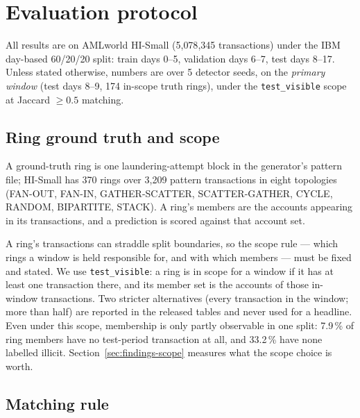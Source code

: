 \section{Evaluation protocol}
\label{sec:data}

All results are on AMLworld HI-Small (5{,}078{,}345 transactions) under the IBM day-based
60/20/20 split: train days 0--5, validation days 6--7, test days 8--17.
Unless stated otherwise, numbers are over 5 detector seeds, on the \emph{primary window}
(test days 8--9, 174 in-scope truth rings), under the \texttt{test\_visible} scope at
Jaccard $\ge 0.5$ matching.

\subsection{Ring ground truth and scope}
\label{sec:data-scope}

A ground-truth ring is one laundering-attempt block in the generator's pattern file; HI-Small
has 370 rings over 3{,}209 pattern transactions in eight topologies (FAN-OUT, FAN-IN,
GATHER-SCATTER, SCATTER-GATHER, CYCLE, RANDOM, BIPARTITE, STACK).
A ring's members are the accounts appearing in its transactions, and a prediction is scored
against that account set.

A ring's transactions can straddle split boundaries, so the scope rule --- which rings a
window is held responsible for, and with which members --- must be fixed and stated. We use
\texttt{test\_visible}: a ring is in scope for a window if it has at least one transaction
there, and its member set is the accounts of those in-window transactions. Two stricter
alternatives (every transaction in the window; more than half) are reported in the released
tables and never used for a headline.
Even under this scope, membership is only partly observable in one split: 7.9\,\% of ring
members have no test-period transaction at all, and 33.2\,\% have none labelled illicit.
Section~\ref{sec:findings-scope} measures what the scope choice is worth.

\subsection{Matching rule}

